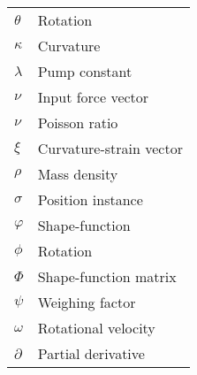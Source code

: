\begin{spacing}{0.9}
\begin{multicols}{2}
\begin{table}[H]
\begin{tabular}{p{2.8cm} p{3.2cm}}
    $\theta$      & Rotation \\
    $\kappa$     &  Curvature \\
    $\lambda$    &  Pump constant \\
    $\nu$     &  Input force vector \\
    $\nu$     &  Poisson ratio \\
    $\xi$     &  Curvature-strain vector \\
    $\rho$     &  Mass density \\
    $\sigma$     &  Position instance \\
    $\varphi$     &  Shape-function \\
    $\phi$       & Rotation  \\
    $\Phi$    &  Shape-function matrix \\
    $\psi$        & Weighing factor \\
    $\omega$     &  Rotational velocity \\
    $\partial$     &  Partial derivative \\ \hline
    
    \end{tabular}
\end{table}



\end{multicols}
\end{spacing}
